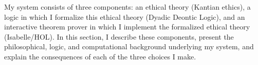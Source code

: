 %
\begin{isabellebody}%
%
%
\isadelimtheory
%
\endisadelimtheory
%
\isatagtheory
%
\endisatagtheory
{\isafoldtheory}%
%
\isadelimtheory
%
\endisadelimtheory
%
\isadelimdocument
%
\endisadelimdocument
%
\isatagdocument
%
\isamarkuptrue%
%
\endisatagdocument
{\isafolddocument}%
%
\isadelimdocument
%
\endisadelimdocument
%
\begin{isamarkuptext}%
My system consists of three components: an ethical theory (Kantian ethics), a logic in which
I formalize this ethical theory (Dyadic Deontic Logic), and an interactive theorem prover in which I 
implement the formalized ethical theory (Isabelle/HOL). In this section, I describe these components, 
present the philosophical, logic, and computational background underlying my system, and explain
the consequences of each of the three choices I make. 


\end{isamarkuptext}
\end{isabellebody}
